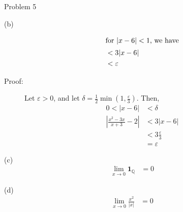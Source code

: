 \documentclass[10pt]{extarticle}
\renewcommand{\mathbf}[1]{\mathbold{#1}}
\newcommand{\Q}{\mathbb{Q}}
\begin{document}
\begin{problem}{Problem 5}
\begin{problem}{(b)}
\begin{description}
\begin{align*}
                                                \shortintertext{for $|x-6| < 1$, we have}
                                                &< 3|x-6|\\
                                                &< \varepsilon
          \end{align*}
        \item[Proof:] Let $\varepsilon > 0$, and let $\delta = \frac{1}{2}\min\left(1,\frac{\varepsilon}{3}\right)$. Then,
          \begin{align*}
            0 < |x-6| &< \delta\\
            \left|\frac{x^2-3x}{x+3} - 2\right| &< 3|x-6|\\
                                                &< 3\frac{\varepsilon}{3}\\
                                                &= \varepsilon
          \end{align*}
      \end{description}
    \end{problem}
    \begin{problem}{(c)}
      \begin{align*}
        \lim_{x\rightarrow 0}\mathbf{1}_{\Q} &= 0
      \end{align*}
    \end{problem}
    \begin{problem}{(d)}
      \begin{align*}
        \lim_{x\rightarrow 0}\frac{x^2}{|x|} &= 0
      \end{align*}
    \end{problem}
  \end{problem}
\end{document}
